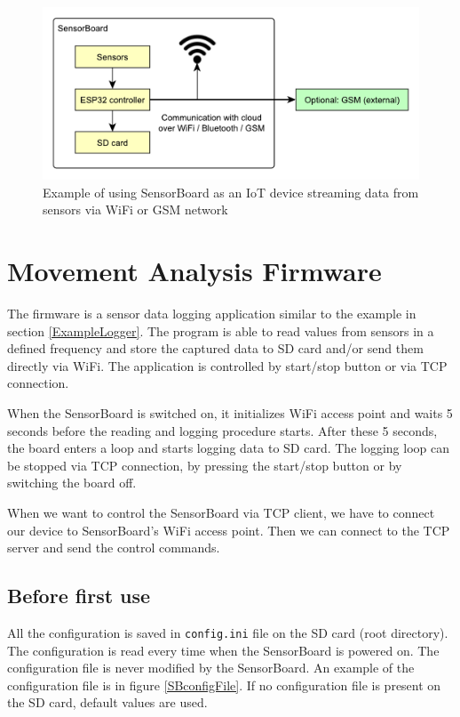 \begin{figure}[H]
	\centering
	\label{UEIoT}
	\caption{Example of using SensorBoard as an IoT device streaming data from sensors via WiFi or GSM network}
	\includegraphics[width=16cm]{img/UsageExamplesIoT.pdf}
\end{figure}

\section{Movement Analysis Firmware}
\label{HorseFirmware}
The firmware is a sensor data logging application similar to the example in section \ref{ExampleLogger}. The program is able to read values from sensors in a defined frequency and store the captured data to SD card and/or send them directly via WiFi. The application is controlled by start/stop button or via TCP connection.

When the SensorBoard is switched on, it initializes WiFi access point and waits 5 seconds before the reading and logging procedure starts. After these 5 seconds, the board enters a loop and starts logging data to SD card. The logging loop can be stopped via TCP connection, by pressing the start/stop button or by switching the board off.

When we want to control the SensorBoard via TCP client, we have to connect our device to SensorBoard's WiFi access point. Then we can connect to the TCP server and send the control commands.

\subsection{Before first use}
\label{beforeFirstUse}
All the configuration is saved in \texttt{config.ini} file on the SD card (root directory). The configuration is read every time when the SensorBoard is powered on. The configuration file is never modified by the SensorBoard. An example of the configuration file is in figure \ref{SBconfigFile}. If no configuration file is present on the SD card, default values are used.

